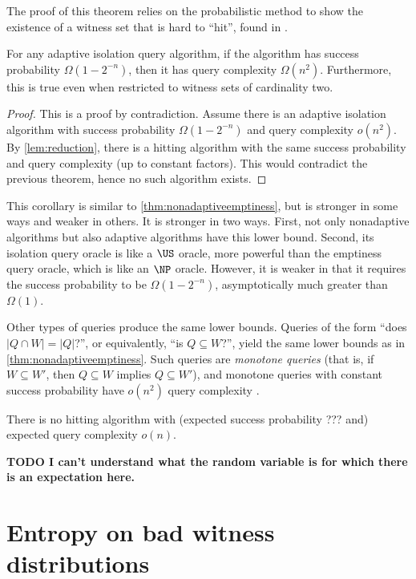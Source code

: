 \documentclass{article}
\newcommand{\todo}[1]{\textbf{TODO #1}}
\begin{document}
The proof of this theorem relies on the probabilistic method to show the existence of a witness set that is hard to ``hit'', found in \autocite{ablp91}.

\begin{corollary}\label{cor:isolationalg}
  For any adaptive isolation query algorithm, if the algorithm has success probability $\Omega(1 - 2^{-n})$, then it has query complexity $\Omega(n^2)$.
  Furthermore, this is true even when restricted to witness sets of cardinality two.
\end{corollary}
\begin{proof}
  This is a proof by contradiction.
  Assume there is an adaptive isolation algorithm with success probability $\Omega(1 - 2^{-n})$ and query complexity $o(n^2)$.
  By \autoref{lem:reduction}, there is a hitting algorithm with the same success probability and query complexity (up to constant factors).
  This would contradict the previous theorem, hence no such algorithm exists.
\end{proof}

This corollary is similar to \autoref{thm:nonadaptiveemptiness}, but is stronger in some ways and weaker in others.
It is stronger in two ways.
First, not only nonadaptive algorithms but also adaptive algorithms have this lower bound.
Second, its isolation query oracle is like a $\US$ oracle, more powerful than the emptiness query oracle, which is like an $\NP$ oracle.
However, it is weaker in that it requires the success probability to be $\Omega(1 - 2^{-n})$, asymptotically much greater than $\Omega(1)$.

Other types of queries produce the same lower bounds.
Queries of the form ``does $|Q \cap W| = |Q|$?'', or equivalently, ``is $Q \subseteq W$?'', yield the same lower bounds as in \autoref{thm:nonadaptiveemptiness}.
Such queries are \emph{monotone queries} (that is, if $W \subseteq W'$, then $Q \subseteq W$ implies $Q \subseteq W'$), and monotone queries with constant success probability have $o(n^2)$ query complexity \autocite[Theorem~1.3]{krw14}.

\begin{theorem}
  There is no hitting algorithm with (expected success probability ??? and) expected query complexity $o(n)$.
\end{theorem}

\todo{I can't understand what the random variable is for which there is an expectation here.}

\section{Entropy on bad witness distributions}
\end{document}

